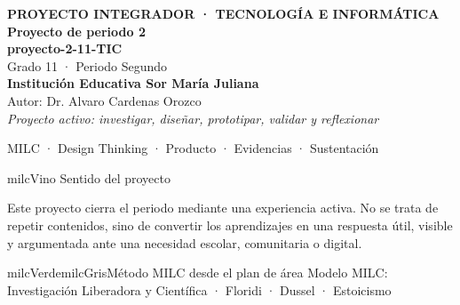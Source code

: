 \documentclass[11pt,letterpaper]{article}
\begin{document}
\thispagestyle{empty}

\vspace*{.85cm}
\begin{tcolorbox}[
  enhanced,colback=milcVino,colframe=milcVino,arc=12mm,width=.86\textwidth,
  boxrule=0pt,left=12mm,right=12mm,top=11mm,bottom=11mm,center,
  overlay={\draw[milcMagenta,line width=2pt,dash pattern=on 9pt off 8pt,rounded corners=10mm]
  ([xshift=7mm,yshift=-7mm]frame.north west) rectangle ([xshift=-7mm,yshift=7mm]frame.south east);}]
  \centering
  {\sffamily\bfseries\color{white}\fontsize{15}{17}\selectfont PROYECTO INTEGRADOR · TECNOLOGÍA E INFORMÁTICA}\\[1.0cm]
  {\sffamily\bfseries\color{white}\fontsize{30}{33}\selectfont Proyecto de periodo 2}\\[3mm]
  {\sffamily\bfseries\color{milcMostaza}\fontsize{25}{28}\selectfont proyecto-2-11-TIC}\\[8mm]
  {\sffamily\color{white}\Large Grado 11 · Periodo Segundo}\\[1.0cm]
  {\sffamily\bfseries\color{white}\large Institución Educativa Sor María Juliana}\\[2mm]
  {\sffamily\color{white}Autor: Dr. Alvaro Cardenas Orozco}\\[4mm]
  {\sffamily\itshape\color{white}Proyecto activo: investigar, diseñar, prototipar, validar y reflexionar}
\end{tcolorbox}
\vfill
\begin{tcolorbox}[enhanced,colback=milcVino!72!black,colframe=milcVino!72!black,arc=5mm,boxrule=0pt,width=.86\textwidth,left=6mm,right=6mm,top=4mm,bottom=4mm,center]
{\color{white}\sffamily\small MILC · Design Thinking · Producto · Evidencias · Sustentación}
\end{tcolorbox}

\newpage
\begin{titlebox}{milcVino}
Sentido del proyecto
\end{titlebox}
\begin{multicols}{2}
Este proyecto cierra el periodo mediante una experiencia activa. No se trata de repetir contenidos, sino de convertir los aprendizajes en una respuesta útil, visible y argumentada ante una necesidad escolar, comunitaria o digital.

\columnbreak
\begin{softbox}{milcVerde}{milcGris}{Método MILC desde el plan de área}
Modelo MILC: Investigación Liberadora y Científica · Floridi · Dussel · Estoicismo
\end{softbox}
\end{multicols}
\end{document}

